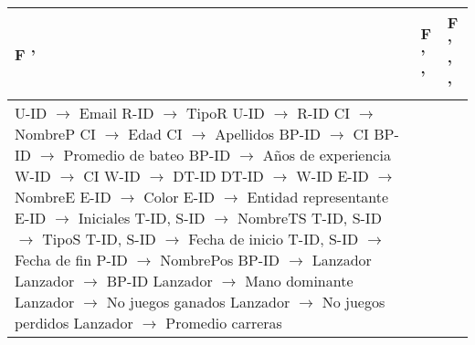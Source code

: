 \documentclass{report}
\begin{document}
    \begin{tabularx}{\textwidth}{|X|X|X|}
        \toprule
        \hfil F ' & \hfil F ' '  & \hfil F ' ' '  \\
        \midrule
        U-ID $\rightarrow$ Email \newline 
        R-ID $\rightarrow$ TipoR \newline 
        U-ID $\rightarrow$ R-ID \newline 
        CI $\rightarrow$ NombreP \newline 
        CI $\rightarrow$ Edad \newline 
        CI $\rightarrow$ Apellidos \newline 
        BP-ID $\rightarrow$ CI \newline 
        BP-ID $\rightarrow$ Promedio de bateo \newline 
        BP-ID $\rightarrow$ Años de experiencia \newline 
        W-ID $\rightarrow$ CI \newline 
        W-ID $\rightarrow$ DT-ID \newline 
        DT-ID $\rightarrow$ W-ID \newline 
        E-ID $\rightarrow$ NombreE \newline 
        E-ID $\rightarrow$ Color \newline 
        E-ID $\rightarrow$ Entidad representante \newline 
        E-ID $\rightarrow$ Iniciales \newline 
        T-ID, S-ID $\rightarrow$ NombreTS \newline 
        T-ID, S-ID $\rightarrow$ TipoS \newline 
        T-ID, S-ID $\rightarrow$ Fecha de inicio \newline 
        T-ID, S-ID $\rightarrow$ Fecha de fin \newline 
        P-ID $\rightarrow$ NombrePos \newline 
        BP-ID $\rightarrow$ Lanzador \newline 
        Lanzador $\rightarrow$ BP-ID \newline 
        Lanzador $\rightarrow$ Mano dominante \newline 
        Lanzador $\rightarrow$ No juegos ganados \newline 
        Lanzador $\rightarrow$ No juegos perdidos \newline 
        Lanzador $\rightarrow$ Promedio carreras \newline 

\end{tabularx}
\end{document}
